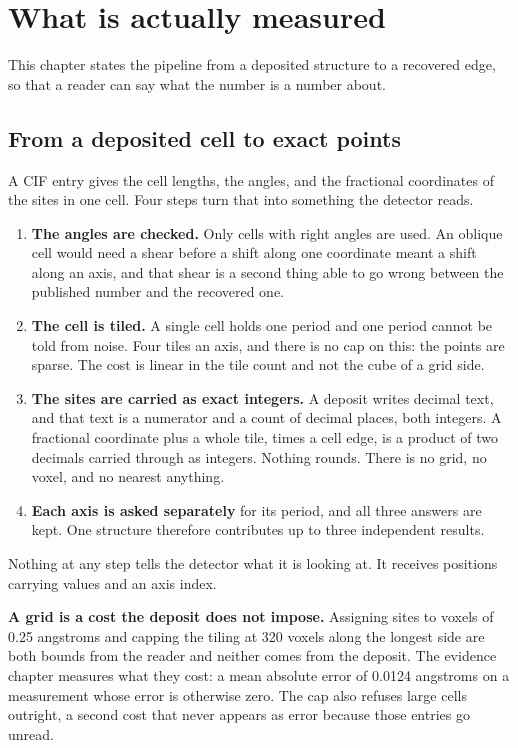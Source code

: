 \chapter{What is actually measured}

This chapter states the pipeline from a deposited structure to a recovered edge, so that a reader can say what the number is a number about.

\section{From a deposited cell to exact points}

A CIF entry gives the cell lengths, the angles, and the fractional coordinates of the sites in one cell. Four steps turn that into something the detector reads.

\begin{enumerate}
\item \textbf{The angles are checked.} Only cells with right angles are used. An oblique cell would need a shear before a shift along one coordinate meant a shift along an axis, and that shear is a second thing able to go wrong between the published number and the recovered one.
\item \textbf{The cell is tiled.} A single cell holds one period and one period cannot be told from noise. Four tiles an axis, and there is no cap on this: the points are sparse. The cost is linear in the tile count and not the cube of a grid side.
\item \textbf{The sites are carried as exact integers.} A deposit writes decimal text, and that text is a numerator and a count of decimal places, both integers. A fractional coordinate plus a whole tile, times a cell edge, is a product of two decimals carried through as integers. Nothing rounds. There is no grid, no voxel, and no nearest anything.
\item \textbf{Each axis is asked separately} for its period, and all three answers are kept. One structure therefore contributes up to three independent results.
\end{enumerate}

Nothing at any step tells the detector what it is looking at. It receives positions carrying values and an axis index.

\textbf{A grid is a cost the deposit does not impose.} Assigning sites to voxels of 0.25 angstroms and capping the tiling at 320 voxels along the longest side are both bounds from the reader and neither comes from the deposit. The evidence chapter measures what they cost: a mean absolute error of 0.0124 angstroms on a measurement whose error is otherwise zero. The cap also refuses large cells outright, a second cost that never appears as error because those entries go unread.

